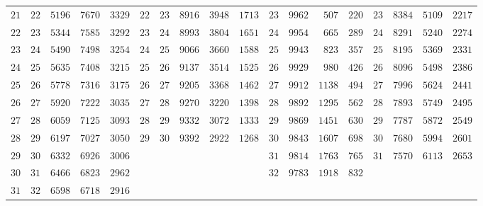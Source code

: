\begin{center}
{{\begin{minipage}{.96\linewidth}
\begin{tabular}{r|r|r|r|r||r|r|r|r|r||r|r|r|r||r|r|r|r}
$21$ & $22$ & $5196$ & $7670$ & $3329$ & $22$ & $23$ & $8916$ & $3948$ & $1713$ & $23$ & $9962$ & $507$ & $220$ & $23$ & $8384$ & $5109$ & $2217$\\
$22$ & $23$ & $5344$ & $7585$ & $3292$ & $23$ & $24$ & $8993$ & $3804$ & $1651$ & $24$ & $9954$ & $665$ & $289$ & $24$ & $8291$ & $5240$ & $2274$\\
$23$ & $24$ & $5490$ & $7498$ & $3254$ & $24$ & $25$ & $9066$ & $3660$ & $1588$ & $25$ & $9943$ & $823$ & $357$ & $25$ & $8195$ & $5369$ & $2331$\\[3pt]
$24$ & $25$ & $5635$ & $7408$ & $3215$ & $25$ & $26$ & $9137$ & $3514$ & $1525$ & $26$ & $9929$ & $980$ & $426$ & $26$ & $8096$ & $5498$ & $2386$\\
$25$ & $26$ & $5778$ & $7316$ & $3175$ & $26$ & $27$ & $9205$ & $3368$ & $1462$ & $27$ & $9912$ & $1138$ & $494$ & $27$ & $7996$ & $5624$ & $2441$\\
$26$ & $27$ & $5920$ & $7222$ & $3035$ & $27$ & $28$ & $9270$ & $3220$ & $1398$ & $28$ & $9892$ & $1295$ & $562$ & $28$ & $7893$ & $5749$ & $2495$\\
$27$ & $28$ & $6059$ & $7125$ & $3093$ & $28$ & $29$ & $9332$ & $3072$ & $1333$ & $29$ & $9869$ & $1451$ & $630$ & $29$ & $7787$ & $5872$ & $2549$\\
$28$ & $29$ & $6197$ & $7027$ & $3050$ & $29$ & $30$ & $9392$ & $2922$ & $1268$ & $30$ & $9843$ & $1607$ & $698$ & $30$ & $7680$ & $5994$ & $2601$\\[3pt]
$29$ & $30$ & $6332$ & $6926$ & $3006$ &  &  &  &  &  & $31$ & $9814$ & $1763$ & $765$ & $31$ & $7570$ & $6113$ & $2653$\\
$30$ & $31$ & $6466$ & $6823$ & $2962$ &  &  &  &  &  & $32$ & $9783$ & $1918$ & $832$ &  &  &  & \\
$31$ & $32$ & $6598$ & $6718$ & $2916$ &  &  &  &  &  &  &  &  &  &  &  &  & \\
\end{tabular}\endgroup
\end{minipage}}}\endgroup
\end{center}
\clearpage
{}%

